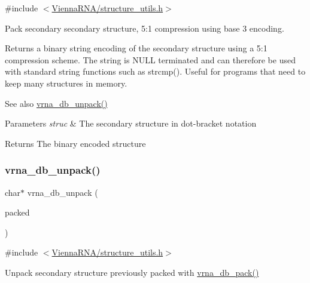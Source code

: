 {\ttfamily \#include $<$\mbox{\hyperlink{structure__utils_8h}{Vienna\+R\+N\+A/structure\+\_\+utils.\+h}}$>$}



Pack secondary secondary structure, 5\+:1 compression using base 3 encoding. 

Returns a binary string encoding of the secondary structure using a 5\+:1 compression scheme. The string is N\+U\+LL terminated and can therefore be used with standard string functions such as strcmp(). Useful for programs that need to keep many structures in memory.

\begin{DoxySeeAlso}{See also}
\mbox{\hyperlink{group__struct__utils_ga6490adff857d84ce06e6f379ae3a4512}{vrna\+\_\+db\+\_\+unpack()}} 
\end{DoxySeeAlso}

\begin{DoxyParams}{Parameters}
{\em struc} & The secondary structure in dot-\/bracket notation \\
\hline
\end{DoxyParams}
\begin{DoxyReturn}{Returns}
The binary encoded structure 
\end{DoxyReturn}
\mbox{\label{group__struct__utils_ga6490adff857d84ce06e6f379ae3a4512}} 
\subsubsection{\texorpdfstring{vrna\+\_\+db\+\_\+unpack()}{vrna\_db\_unpack()}}
{\footnotesize\ttfamily char$\ast$ vrna\+\_\+db\+\_\+unpack (\begin{DoxyParamCaption}\item[{const char $\ast$}]{packed }\end{DoxyParamCaption})}



{\ttfamily \#include $<$\mbox{\hyperlink{structure__utils_8h}{Vienna\+R\+N\+A/structure\+\_\+utils.\+h}}$>$}



Unpack secondary structure previously packed with \mbox{\hyperlink{group__struct__utils_ga55c4783060a1464f862f858d5599c9e1}{vrna\+\_\+db\+\_\+pack()}} 

